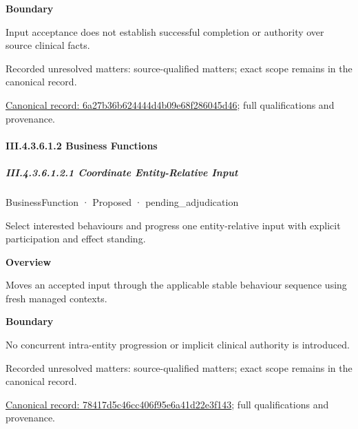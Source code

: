 \textbf{Boundary}



Input acceptance does not establish successful completion or authority over source clinical facts.


{\small Recorded unresolved matters: source-qualified matters; exact scope remains in the canonical record.}\par
{\footnotesize \href{../../../../continuum/business/business-service/6a27b36b624444d4b09e68f286045d46.md}{Canonical record: 6a27b36b624444d4b09e68f286045d46}; full qualifications and provenance.}\par
\paragraph*{III.4.3.6.1.2 Business Functions}
\label{navigation:III.4.3.6.1.2}

\subparagraph*{III.4.3.6.1.2.1 Coordinate Entity-Relative Input}
\label{navigation:III.4.3.6.1.2.1}

\label{element:78417d5c46cc406f95e6a41d22e3f143}
{\small BusinessFunction · Proposed · pending\_adjudication}\par

Select interested behaviours and progress one entity-relative input with explicit participation and effect standing.



\textbf{Overview}



Moves an accepted input through the applicable stable behaviour sequence using fresh managed contexts.



\textbf{Boundary}



No concurrent intra-entity progression or implicit clinical authority is introduced.


{\small Recorded unresolved matters: source-qualified matters; exact scope remains in the canonical record.}\par
{\footnotesize \href{../../../../continuum/business/business-function/78417d5c46cc406f95e6a41d22e3f143.md}{Canonical record: 78417d5c46cc406f95e6a41d22e3f143}; full qualifications and provenance.}\par
